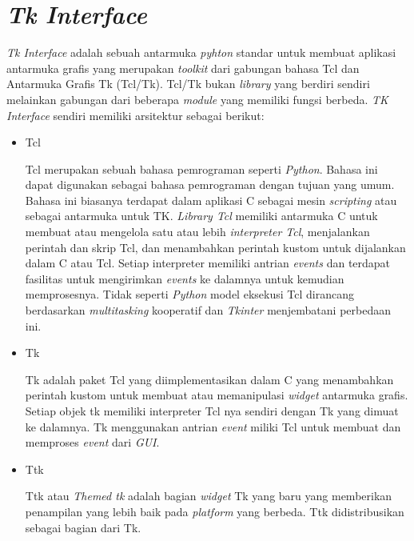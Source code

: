 \section{\textit{Tk Interface}~\cite{tkinter}}
\label{sec:tkinter}
\textit{Tk Interface} adalah sebuah antarmuka \textit{pyhton} standar untuk membuat aplikasi antarmuka grafis yang merupakan \textit{toolkit} dari gabungan bahasa Tcl dan Antarmuka Grafis Tk (Tcl/Tk). Tcl/Tk bukan \textit{library} yang berdiri sendiri melainkan gabungan dari beberapa \textit{module} yang memiliki fungsi berbeda. \textit{TK Interface} sendiri memiliki arsitektur sebagai berikut:
\begin{itemize}
    \item Tcl
    
    Tcl merupakan sebuah bahasa pemrograman seperti \textit{Python}. Bahasa ini dapat digunakan sebagai bahasa pemrograman dengan tujuan yang umum. Bahasa ini biasanya terdapat dalam aplikasi C sebagai mesin \textit{scripting} atau sebagai antarmuka untuk TK. \textit{Library Tcl} memiliki antarmuka C untuk membuat atau mengelola satu atau lebih \textit{interpreter Tcl}, menjalankan perintah dan skrip Tcl, dan menambahkan perintah kustom untuk dijalankan dalam C atau Tcl. Setiap interpreter memiliki antrian \textit{events} dan terdapat fasilitas untuk mengirimkan \textit{events} ke dalamnya untuk kemudian memprosesnya. Tidak seperti \textit{Python} model eksekusi Tcl dirancang berdasarkan \textit{multitasking} kooperatif dan \textit{Tkinter} menjembatani perbedaan ini.

    \item Tk

    Tk adalah paket Tcl yang diimplementasikan dalam C yang menambahkan perintah kustom untuk membuat atau memanipulasi \textit{widget} antarmuka grafis. Setiap objek tk memiliki interpreter Tcl nya sendiri dengan Tk yang dimuat ke dalamnya. Tk menggunakan antrian \textit{event} miliki Tcl untuk membuat dan memproses \textit{event} dari \textit{GUI}.

    \item Ttk

    Ttk atau \textit{Themed tk} adalah bagian \textit{widget} Tk yang baru yang memberikan penampilan yang lebih baik pada \textit{platform} yang berbeda. Ttk didistribusikan sebagai bagian dari Tk. 
    
\end{itemize}

